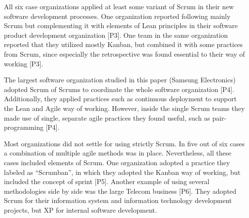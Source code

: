 All six case organizations applied at least some variant of Scrum in
their new software development processes. One organization reported
following mainly Scrum but complementing it with elements of Lean
principles in their software product development organization [P3].
One team in the same organization reported that they utilized mostly
Kanban, but combined it with some practices from Scrum, since especially
the retrospective was found essential to their way of working [P3].

The largest software organization studied in this paper (Samsung
Electronics) adopted Scrum of Scrums to coordinate the whole software
organization [P4]. Additionally, they applied practices such as
continuous deployment to support the Lean and Agile way of working.
However, inside the single Scrum teams they made use of single, separate
agile practices they found useful, such as pair-programming [P4].

Most organizations did not settle for using strictly Scrum. In five
out of six cases a combination of multiple agile methods was in
place. Nevertheless, all these cases included elements of Scrum. One
organization adopted a practice they labeled as ``Scrumban'', in which
they adopted the Kanban way of working, but included the concept of
sprint [P5]. Another example of using several methodologies side by
side was the large Telecom business [P6]. They adopted Scrum for their
information system and information technology development projects, but
XP for internal software development.
